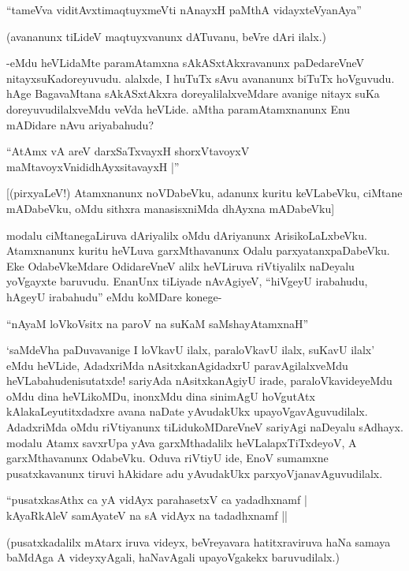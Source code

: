 \begin{shloka}
``tameVva viditAvx\s timaqtuyxmeVti nAnayxH paMthA vidayxteV\s yanAya''
\end{shloka}

(avananunx tiLideV maqtuyxvanunx dATuvanu, beVre dAri ilalx.)

-eMdu heVLidaMte paramAtamxna sAkASxtAkxravanunx paDedareVneV nitayxsuKadoreyuvudu. alalxde, I huTuTx sAvu avananunx biTuTx hoVguvudu. hAge BagavaMtana sAkASxtAkxra doreyalilalxveMdare avanige nitayx suKa doreyuvudilalxveMdu veVda heVLide. aMtha paramAtamxnanunx Enu mADidare nAvu ariyabahudu?

\begin{shloka}
``AtAmx vA areV darxSaTxvayxH shorxVtavoyxV\\
maMtavoyxVnididhAyxsitavayxH |''
\end{shloka}

[(pirxyaLeV!) Atamxnanunx noVDabeVku, adanunx kuritu keVLabeVku, ciMtane mADabeVku, oMdu sithxra manasisxniMda dhAyxna mADabeVku]

modalu ciMtanegaLiruva dAriyalilx oMdu dAriyanunx ArisikoLaLxbeVku. Atamxnanunx kuritu heVLuva garxMthavanunx Odalu parxyatanxpaDabeVku. Eke OdabeVkeMdare OdidareVneV alilx heVLiruva riVtiyalilx naDeyalu yoVgayxte baruvudu. EnanUnx tiLiyade nAvAgiyeV, ``hiVgeyU irabahudu, hAgeyU irabahudu'' eMdu koMDare konege-

\begin{shloka}
``nAyaM loVkoV\s sitx na paroV na suKaM saMshayAtamxnaH''
\end{shloka}

`saMdeVha paDuvavanige I loVkavU ilalx, paraloVkavU ilalx, suKavU ilalx' eMdu heVLide, AdadxriMda nAsitxkanAgidadxrU paravAgilalxveMdu heVLabahudenisutatxde! sariyAda nAsitxkanAgiyU irade, paraloVkavideyeMdu oMdu dina heVLikoMDu, inonxMdu dina sinimAgU hoVgutAtx kAlakaLeyutitxdadxre avana naDate yAvudakUkx upayoVgavAguvudilalx. AdadxriMda oMdu riVtiyanunx tiLidukoMDareVneV sariyAgi naDeyalu sAdhayx. modalu Atamx savxrUpa yAva garxMthadalilx heVLalapxTiTxdeyoV, A garxMthavanunx OdabeVku. Oduva riVtiyU ide, EnoV sumamxne pusatxkavanunx tiruvi hAkidare adu yAvudakUkx parxyoVjanavAguvudilalx.

\begin{shloka}
``pusatxkasAthx ca yA vidAyx parahasetxV ca yadadhxnamf |\\
kAyaRkAleV samAyateV na sA vidAyx na tadadhxnamf ||
\end{shloka}

(pusatxkadalilx mAtarx iruva videyx, beVreyavara hatitxraviruva haNa samaya baMdAga A videyxyAgali, haNavAgali upayoVgakekx baruvudilalx.)


